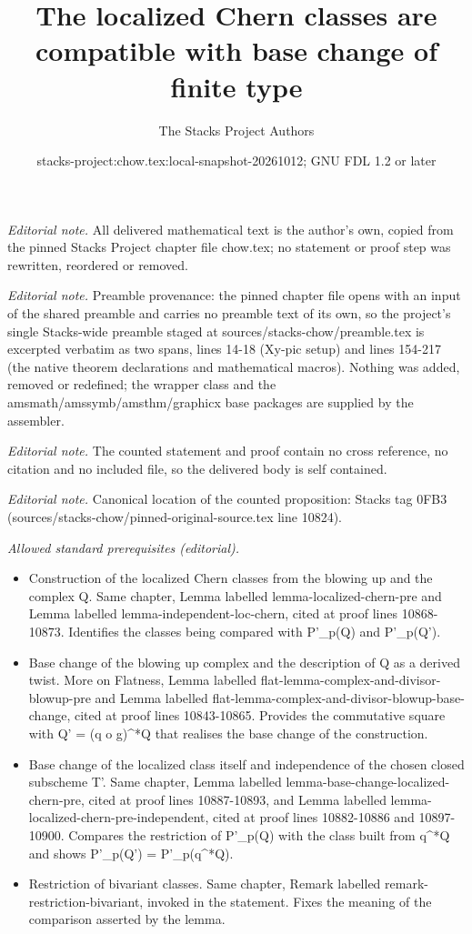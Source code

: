 \documentclass[10pt,a4paper]{amsart}
\title{The localized Chern classes are compatible with base change of finite type}
\author{The Stacks Project Authors}
\date{stacks-project:chow.tex:local-snapshot-20261012; GNU FDL 1.2 or later}
\theoremstyle{plain}
\theoremstyle{definition}
\theoremstyle{remark}
\numberwithin{equation}{subsection}
\begin{document}
\maketitle
\noindent\textit{Editorial note.} All delivered mathematical text is the author's own, copied from the pinned Stacks Project chapter file chow.tex; no statement or proof step was rewritten, reordered or removed.\par\medskip
\noindent\textit{Editorial note.} Preamble provenance: the pinned chapter file opens with an input of the shared preamble and carries no preamble text of its own, so the project's single Stacks-wide preamble staged at sources/stacks-chow/preamble.tex is excerpted verbatim as two spans, lines 14-18 (Xy-pic setup) and lines 154-217 (the native theorem declarations and mathematical macros). Nothing was added, removed or redefined; the wrapper class and the amsmath/amssymb/amsthm/graphicx base packages are supplied by the assembler.\par\medskip
\noindent\textit{Editorial note.} The counted statement and proof contain no cross reference, no citation and no included file, so the delivered body is self contained.\par\medskip
\noindent\textit{Editorial note.} Canonical location of the counted proposition: Stacks tag 0FB3 (sources/stacks-chow/pinned-original-source.tex line 10824).\par\medskip
\noindent\textit{Allowed standard prerequisites (editorial).}\begin{itemize}
\item Construction of the localized Chern classes from the blowing up and the complex Q. Same chapter, Lemma labelled lemma-localized-chern-pre and Lemma labelled lemma-independent-loc-chern, cited at proof lines 10868-10873. Identifies the classes being compared with P'\_p(Q) and P'\_p(Q').
\item Base change of the blowing up complex and the description of Q as a derived twist. More on Flatness, Lemma labelled flat-lemma-complex-and-divisor-blowup-pre and Lemma labelled flat-lemma-complex-and-divisor-blowup-base-change, cited at proof lines 10843-10865. Provides the commutative square with Q' = (q o g)\textasciicircum{}*Q that realises the base change of the construction.
\item Base change of the localized class itself and independence of the chosen closed subscheme T'. Same chapter, Lemma labelled lemma-base-change-localized-chern-pre, cited at proof lines 10887-10893, and Lemma labelled lemma-localized-chern-pre-independent, cited at proof lines 10882-10886 and 10897-10900. Compares the restriction of P'\_p(Q) with the class built from q\textasciicircum{}*Q and shows P'\_p(Q') = P'\_p(q\textasciicircum{}*Q).
\item Restriction of bivariant classes. Same chapter, Remark labelled remark-restriction-bivariant, invoked in the statement. Fixes the meaning of the comparison asserted by the lemma.
\end{itemize}\medskip
\end{document}
